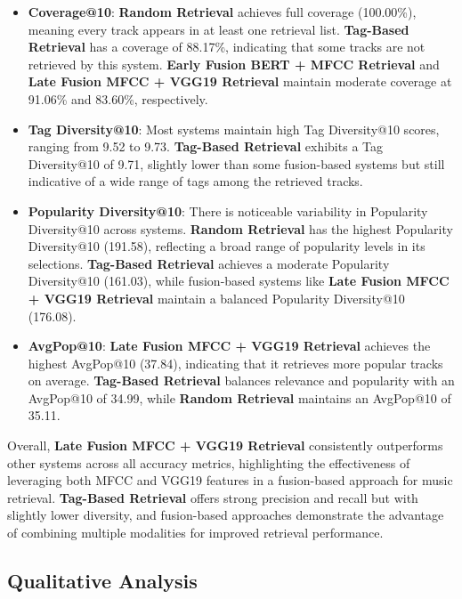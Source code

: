\documentclass[sigconf]{acmart}
\begin{document}
\begin{itemize}
    \item \textbf{Coverage@10}: \textbf{Random Retrieval} achieves full coverage (100.00\%), meaning every track appears in at least one retrieval list. \textbf{Tag-Based Retrieval} has a coverage of 88.17\%, indicating that some tracks are not retrieved by this system. \textbf{Early Fusion BERT + MFCC Retrieval} and \textbf{Late Fusion MFCC + VGG19 Retrieval} maintain moderate coverage at 91.06\% and 83.60\%, respectively.
    
    \item \textbf{Tag Diversity@10}: Most systems maintain high Tag Diversity@10 scores, ranging from 9.52 to 9.73. \textbf{Tag-Based Retrieval} exhibits a Tag Diversity@10 of 9.71, slightly lower than some fusion-based systems but still indicative of a wide range of tags among the retrieved tracks.
    
    \item \textbf{Popularity Diversity@10}: There is noticeable variability in Popularity Diversity@10 across systems. \textbf{Random Retrieval} has the highest Popularity Diversity@10 (191.58), reflecting a broad range of popularity levels in its selections. \textbf{Tag-Based Retrieval} achieves a moderate Popularity Diversity@10 (161.03), while fusion-based systems like \textbf{Late Fusion MFCC + VGG19 Retrieval} maintain a balanced Popularity Diversity@10 (176.08).
    
    \item \textbf{AvgPop@10}: \textbf{Late Fusion MFCC + VGG19 Retrieval} achieves the highest AvgPop@10 (37.84), indicating that it retrieves more popular tracks on average. \textbf{Tag-Based Retrieval} balances relevance and popularity with an AvgPop@10 of 34.99, while \textbf{Random Retrieval} maintains an AvgPop@10 of 35.11.
\end{itemize}

\noindent Overall, \textbf{Late Fusion MFCC + VGG19 Retrieval} consistently outperforms other systems across all accuracy metrics, highlighting the effectiveness of leveraging both MFCC and VGG19 features in a fusion-based approach for music retrieval. \textbf{Tag-Based Retrieval} offers strong precision and recall but with slightly lower diversity, and fusion-based approaches demonstrate the advantage of combining multiple modalities for improved retrieval performance.


\subsection{Qualitative Analysis}
\label{subsec:qualitative_analysis}
\end{document}
